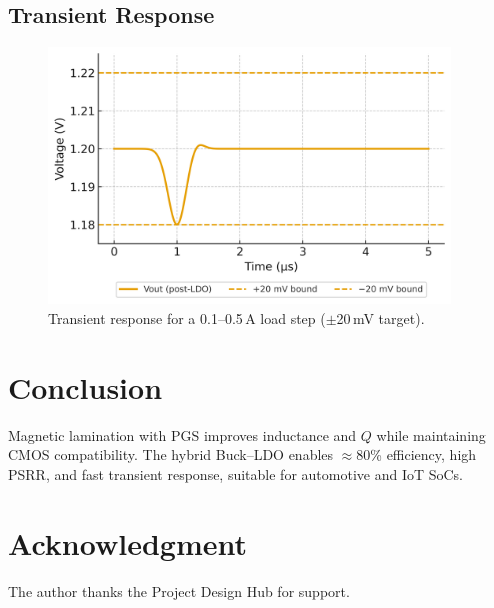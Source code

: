 \documentclass[journal]{IEEEtran}
\begin{document}
\subsection{Transient Response}
\begin{figure}[t]
  \centering
  \includegraphics[width=0.95\textwidth]{fig5_transient_response.png}
  \caption{Transient response for a 0.1--0.5\,A load step ($\pm$20\,mV target).}
  \label{fig:transient}
\end{figure}

\section{Conclusion}
Magnetic lamination with PGS improves inductance and $Q$ while maintaining CMOS compatibility. The hybrid Buck--LDO enables $\approx$80\% efficiency, high PSRR, and fast transient response, suitable for automotive and IoT SoCs.

\section*{Acknowledgment}
The author thanks the Project Design Hub for support.
\end{document}
